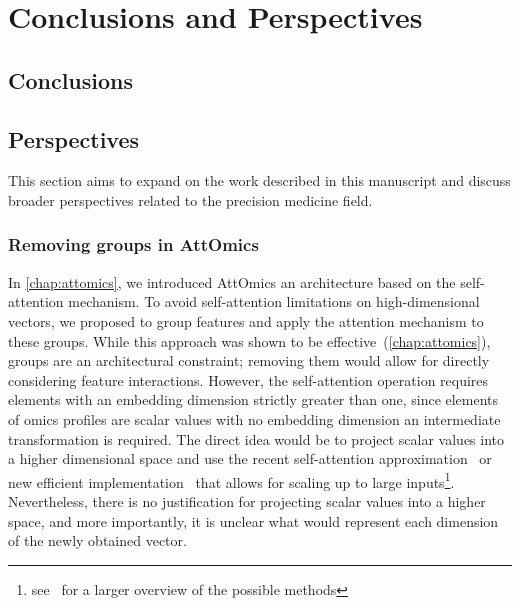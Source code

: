 \documentclass[../main.tex]{subfiles}
\begin{document}
\chapter{Conclusions and Perspectives}
\minitocpage
\section{Conclusions}

\section{Perspectives}
	This section aims to expand on the work described in this manuscript and discuss broader perspectives related to the precision medicine field.
	\subsection{Removing groups in AttOmics}\label{sec:scalar_attention}
		In \cref{chap:attomics}, we introduced AttOmics an architecture based on the self-attention mechanism.
		To avoid self-attention limitations on high-dimensional vectors, we proposed to group features and apply the attention mechanism to these groups.
		While this approach was shown to be effective~(\cref{chap:attomics}), groups are an architectural constraint; removing them would allow for directly considering feature interactions.
		However, the self-attention operation requires elements with an embedding dimension strictly greater than one, since elements of omics profiles are scalar values with no embedding dimension an intermediate transformation is required.
		The direct idea would be to project scalar values into a higher dimensional space and use the recent self-attention approximation~\cite{xiongNystrOmformerNystr2021,Linformer} or new efficient implementation~\cite{FlashAttention,rabeSelfattentionDoesNot2021,bolyaHydraAttentionEfficient2022a} that allows for scaling up to large inputs\footnote{see~\cite{EfficientTransformers} for a larger overview of the possible methods}.
		Nevertheless, there is no justification for projecting scalar values into a higher space, and more importantly, it is unclear what would represent each dimension of the newly obtained vector.
\end{document}
